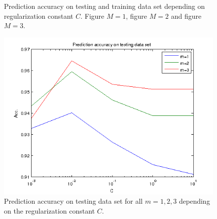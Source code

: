 \documentclass[a4paper, 12pt, titlepage]{article}
\begin{document}
\begin{figure}
	\caption{Prediction accuracy on testing and training data set depending on regularization constant $C$. Figure \protect{} $M=1$, figure \protect{} $M=2$ and figure \protect{} $M=3$.}
	\label{fig:ptacc}
\end{figure}

\begin{figure}
	\centering
	\includegraphics[width=12cm]{images/testing.png}
	\caption{Prediction accuracy on testing data set for all $m=1,2,3$ depending on the regularization constant $C$.}
	\label{fig:testing}
\end{figure}
\begin{table}
	\centering
	\caption{Prediction accuracy \protect{} on testing data set and \protect{} on training data set.}
	\label{tab:data}
\end{table}
\end{document}
